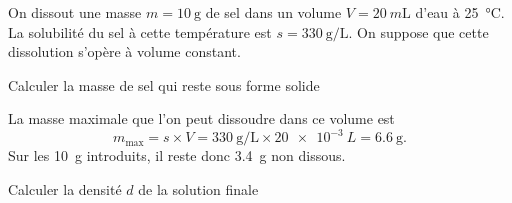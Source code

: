 
\hauteurLargeurCadreReponse		{7mm}{4cm}
\typeEntrainement				{} %
\initialisationEntrainement

\debutEntrainement

On dissout une masse $m=\SI{10}{\gram}$ de sel dans un volume $V=\SI{20}{m\liter}$ d'eau à \SI{25}{\celsius}. La solubilité du sel à cette température est $s=\SI{330}{\gram\per\liter}$. On suppose que cette dissolution s'opère à volume constant.


\begin{enonce}
Calculer la masse de sel qui reste sous forme solide
\end{enonce}


\begin{corrige}
La masse maximale que l'on peut dissoudre dans ce volume est 
\[
m_\text{max}=s\times V=\SI{330}{\gram\per\liter}\times\SI{20e-3}{L}=\SI{6,6}{\gram}.
\]
Sur les \SI{10}{\gram} introduits, il reste donc \SI{3,4}{\gram} non dissous.
\end{corrige}



\begin{enonce}
Calculer la densité $d$ de la solution finale
\end{enonce}


